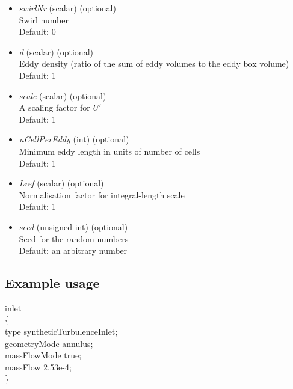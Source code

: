 \begin{itemize}
  \item \textit{swirlNr} (scalar) (optional)\\
    Swirl number\\
    Default: 0

  \item \textit{d} (scalar) (optional)\\
    Eddy density (ratio of the sum of eddy volumes to the eddy box volume)\\
    Default: 1

  \item \textit{scale} (scalar) (optional)\\
    A scaling factor for $U'$\\
    Default: 1

  \item \textit{nCellPerEddy} (int) (optional)\\
    Minimum eddy length in units of number of cells\\
    Default: 1

  \item \textit{Lref} (scalar) (optional)\\
    Normalisation factor for integral-length scale\\
    Default: 1
    
  \item \textit{seed} (unsigned int) (optional)\\
    Seed for the random numbers\\
    Default: an arbitrary number

\end{itemize}

\subsection{Example usage}%
\label{sub:Example usage}

\noindent inlet\\
  \{\\
    type            syntheticTurbulenceInlet;\\
    geometryMode    annulus;\\
    massFlowMode    true;\\
    massFlow        2.53e-4;\\
  \}\\

